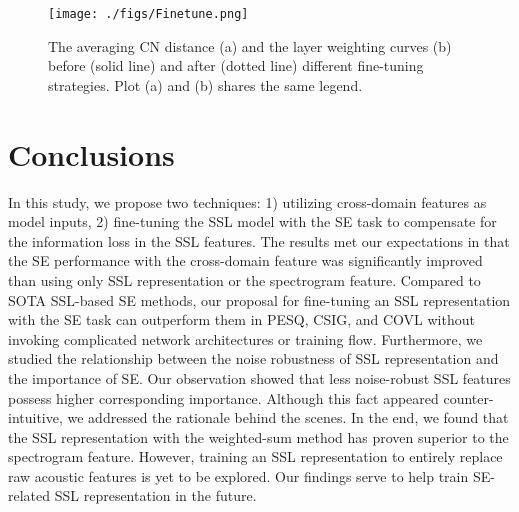 \documentclass[a4paper]{article}
\begin{document}
\begin{figure}[t]
  \centering
  \texttt{[image: ./figs/Finetune.png]}
  \caption{The averaging CN distance (a) and the layer weighting curves (b) before (solid line) and after (dotted line) different fine-tuning strategies. Plot (a) and (b) shares the same legend.}
  \label{fig:finetune}
\end{figure}

\section{Conclusions}




In this study, we propose two techniques: 1) utilizing cross-domain features as model inputs, 2) fine-tuning the SSL model with the SE task to compensate for the information loss in the SSL features. The results met our expectations in that the SE performance with the cross-domain feature was significantly improved than using only SSL representation or the spectrogram feature. Compared to SOTA SSL-based SE methods, our proposal for fine-tuning an SSL representation with the SE task can outperform them in PESQ, CSIG, and COVL without invoking complicated network architectures or training flow.  Furthermore, we studied the relationship between the noise robustness of SSL representation and the importance of SE. Our observation showed that less noise-robust SSL features possess higher corresponding importance. Although this fact appeared counter-intuitive, we addressed the rationale behind the scenes. In the end, we found that the SSL representation with the weighted-sum method has proven superior to the spectrogram feature. However, training an SSL representation to entirely replace raw acoustic features is yet to be explored. Our findings serve to help train SE-related SSL representation in the future.






\end{document}
